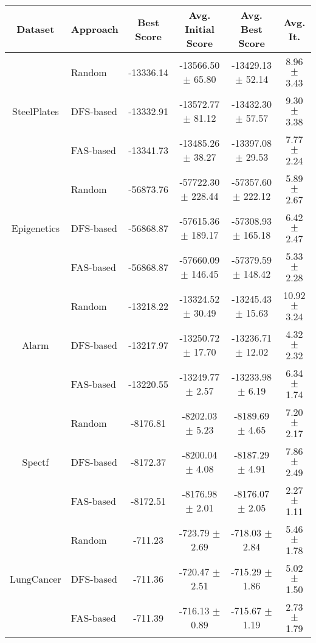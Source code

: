 \begin{tabular}{| c | l | c | c | c | c | }
	\hline
	Dataset & Approach & Best Score & Avg. Initial Score & Avg. Best Score & Avg. It. \\ \hline
				
	\multirow{3}{*}{SteelPlates} & Random & -13336.14 & -13566.50 $\pm$ 65.80 & -13429.13 $\pm$ 52.14 & 8.96 $\pm$ 3.43 \\ \cline{2-6} 
			& DFS-based & \alert{-13332.91} & -13572.77 $\pm$ 81.12 & -13432.30 $\pm$ 57.57 & 9.30 $\pm$ 3.38 \\ \cline{2-6}
			& FAS-based & -13341.73 & \alert{-13485.26 $\pm$ 38.27} & \alert{-13397.08 $\pm$ 29.53} & \alert{7.77 $\pm$ 2.24} \\ \hline \hline
						
	\multirow{3}{*}{Epigenetics} & Random & -56873.76 & -57722.30 $\pm$ 228.44 & -57357.60 $\pm$ 222.12 & 5.89 $\pm$ 2.67 \\ \cline{2-6} 
			& DFS-based & \alert{-56868.87} & \alert{-57615.36 $\pm$ 189.17} & \alert{-57308.93 $\pm$ 165.18} & 6.42 $\pm$ 2.47 \\ \cline{2-6}
			& FAS-based & \alert{-56868.87} & -57660.09 $\pm$ 146.45 & -57379.59 $\pm$ 148.42 & \alert{5.33 $\pm$ 2.28} \\ \hline \hline

	\multirow{3}{*}{Alarm} & Random & -13218.22 & -13324.52 $\pm$ 30.49 & -13245.43 $\pm$ 15.63 & 10.92 $\pm$ 3.24 \\ \cline{2-6} 
			& DFS-based & \alert{-13217.97} & -13250.72 $\pm$ 17.70 & -13236.71 $\pm$ 12.02 & \alert{4.32 $\pm$ 2.32} \\ \cline{2-6}
			& FAS-based & -13220.55 & \alert{-13249.77 $\pm$ 2.57} & \alert{-13233.98 $\pm$ 6.19} & 6.34 $\pm$ 1.74 \\ \hline \hline

	\multirow{3}{*}{Spectf} & Random & -8176.81 & -8202.03 $\pm$ 5.23 & -8189.69 $\pm$ 4.65 & 7.20 $\pm$ 2.17 \\ \cline{2-6} 
			& DFS-based & \alert{-8172.37} & -8200.04 $\pm$ 4.08 & -8187.29 $\pm$ 4.91 & 7.86 $\pm$ 2.49 \\ \cline{2-6}
			& FAS-based & -8172.51 & \alert{-8176.98 $\pm$ 2.01} & \alert{-8176.07 $\pm$ 2.05} & \alert{2.27 $\pm$ 1.11} \\ \hline \hline 
					
	\multirow{3}{*}{LungCancer} & Random & \alert{-711.23} & -723.79 $\pm$ 2.69 & -718.03 $\pm$ 2.84 & 5.46 $\pm$ 1.78 \\ \cline{2-6} 
			& DFS-based & -711.36 & -720.47 $\pm$ 2.51 & \alert{-715.29 $\pm$ 1.86} & 5.02 $\pm$ 1.50 \\ \cline{2-6}
			& FAS-based & -711.39 & \alert{-716.13 $\pm$ 0.89} & -715.67 $\pm$ 1.19 & \alert{2.73 $\pm$ 1.79} \\ \hline
\end{tabular}